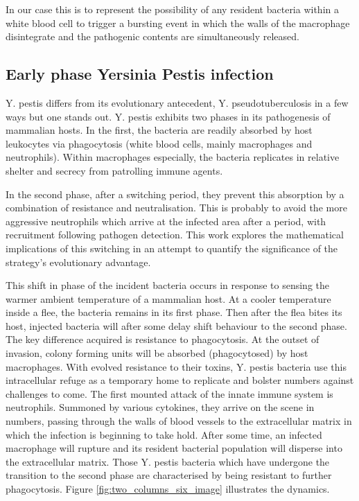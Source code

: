 \noindent
In our case this is to represent the possibility of any resident bacteria within a white blood cell to trigger a bursting event in which the walls of the macrophage disintegrate and the pathogenic contents are simultaneously released. 





\subsection{Early phase Yersinia Pestis infection}

Y. pestis differs from its evolutionary antecedent, Y. pseudotuberculosis in a few ways but one stands out. Y. pestis exhibits two phases in its pathogenesis of mammalian hosts. In the first, the bacteria are readily absorbed by host leukocytes via phagocytosis (white blood cells, mainly macrophages and neutrophils). Within macrophages especially, the bacteria replicates in relative shelter and secrecy from patrolling immune agents.\par
In the second phase, after a switching period, they prevent this absorption by a combination of resistance and neutralisation. This is probably to avoid the more aggressive neutrophils which arrive at the infected area after a period, with recruitment following pathogen detection. This work explores the mathematical implications of this switching in an attempt to quantify the significance of the strategy's evolutionary advantage.\par 


This shift in phase of the incident bacteria occurs in response to sensing the warmer ambient temperature of a mammalian host. At a cooler temperature inside a flee, the bacteria remains in its first phase. Then after the flea bites its host, injected bacteria will after some delay shift behaviour to the second phase. The key difference acquired is resistance to phagocytosis. At the outset of invasion, colony forming units will be absorbed (phagocytosed) by host macrophages. With evolved resistance to their toxins, Y. pestis bacteria use this intracellular refuge as a temporary home to replicate and bolster numbers against challenges to come. The first mounted attack of the innate immune system is neutrophils. Summoned by various cytokines, they arrive on the scene in numbers, passing through the walls of blood vessels to the extracellular matrix in which the infection is beginning to take hold. After some time, an infected macrophage will rupture and its resident bacterial population will disperse into the extracellular matrix. Those Y. pestis bacteria which have undergone the transition to the second phase are characterised by being resistant to further phagocytosis.  Figure \ref{fig:two_columns_six_image} illustrates the dynamics. 





